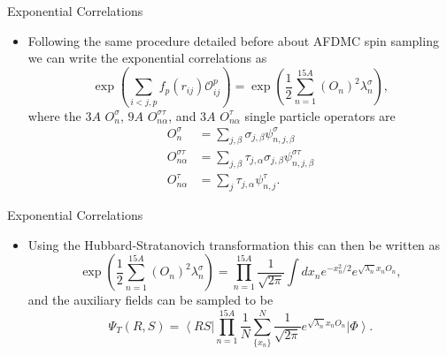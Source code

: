 \documentclass{beamer}
\newcommand{\ket}[1]{\left| #1 \right>}
\newcommand{\bra}[1]{\left< #1 \right|}
\newcommand{\Oijp}{\mathcal{O}^p_{ij}}
\begin{document}
\begin{frame}{Exponential Correlations}
\begin{itemize}
   \item Following the same procedure detailed before about AFDMC spin sampling we can write the exponential correlations as
   \begin{equation*}
      \exp\left(\sum\limits_{i<j,p}f_p(r_{ij})\Oijp\right) = \exp\left(\frac{1}{2}\sum\limits_{n=1}^{15A} \left(O_{n}\right)^2 \lambda_n^{\sigma}\right),
   \end{equation*}
   where the $3A$ $O_{n}^{\sigma}$, $9A$ $O_{n\alpha}^{\sigma\tau}$, and $3A$ $O_{n\alpha}^{\tau}$ single particle operators are
   \begin{equation*}
   \begin{split}
      O_{n}^{\sigma} &= \sum\limits_{j,\beta} \sigma_{j,\beta}\psi_{n,j,\beta}^{\sigma} \\
      O_{n\alpha}^{\sigma\tau} &= \sum\limits_{j,\beta} \tau_{j,\alpha}\sigma_{j,\beta}\psi_{n,j,\beta}^{\sigma\tau} \\
      O_{n\alpha}^{\tau} &= \sum\limits_{j} \tau_{j,\alpha}\psi_{n,j}^{\tau}.
   \end{split}
   \end{equation*}
\end{itemize}
\end{frame}

\begin{frame}{Exponential Correlations}
\begin{itemize}
   \item Using the Hubbard-Stratanovich transformation this can then be written as
   \begin{equation}
      \exp\left(\frac{1}{2}\sum\limits_{n=1}^{15A} \left(O_{n}\right)^2 \lambda_n^{\sigma}\right) = \prod\limits_{n=1}^{15A} \frac{1}{\sqrt{2\pi}}\int dx_n e^{-x_n^2/2}e^{\sqrt{\lambda_n}x_nO_n},
   \end{equation}
   and the auxiliary fields can be sampled to be
   \begin{equation}
      \Psi_T(R,S) = \bra{RS}\prod\limits_{n=1}^{15A} \frac{1}{N} \sum\limits_{\{x_n\}}^N\frac{1}{\sqrt{2\pi}}e^{\sqrt{\lambda_n}x_nO_n}\ket{\Phi}.
   \end{equation}
\end{itemize}
\end{frame}
\end{document}
